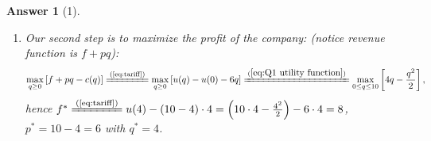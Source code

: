 \documentclass{article}
\newtheorem*{ans}{Answer}
\newcommand{\1}{{\bf 1}}
\newcommand{\0}{{\mathbf{0}}}
\newcommand{\<}{\langle}
\renewcommand{\>}{\rangle}
\newcommand{\dps}{\displaystyle}
\begin{document}
\begin{ans}[1]
\begin{enumerate}[(a)]
\begin{enumerate}[i]
%	
	\item Our second step is to maximize the profit of the company: (notice revenue function is $ f + pq$):
	$$\max_{q \ge 0} \left[ f + pq - c(q)\right] \xlongequal{\text{(\ref{eq:tariff})}} \max_{q \ge 0}\left[ u(q) - u(0)  - 6q\right] \xlongequal{(\ref{eq:Q1 utility function})} \max_{0 \le q \le 10} \left[4 q - \frac{q^2}2 \right] ,$$
hence $f^* \xlongequal{\text{(\ref{eq:tariff})} } u(4) - (10-4)\cdot 4 = \left(10\cdot 4 - \frac{4^2}2\right) - 6 \cdot 4 = 8$, $p^* = 10 -4 = 6$ with $q^* =4$.


\end{enumerate}
\end{enumerate}
\end{ans}
\end{document}

